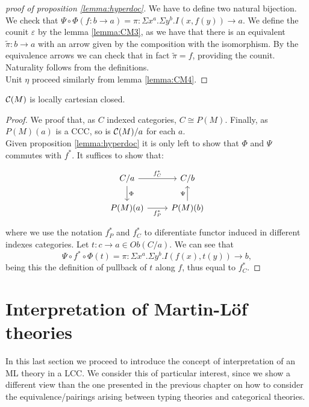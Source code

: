 \begin{proof}[proof of proposition \ref{lemma:hyperdoc}]
  We have to define two natural bijection. We check that $\Psi\circ\Phi(f:b\to a) = \pi: \Sigma x^a. \Sigma y^b.I(x,f(y)) \to a$. We define the counit $\varepsilon$ by the lemma \ref{lemma:CM3}, as we have that there is an equivalent $\tilde \pi : b \to a$ with an arrow given by the composition with the isomorphism. By the equivalence arrows we can check that in fact $\tilde \pi = f$, providing the counit. Naturality follows from the definitions.\\

  Unit $\eta$ proceed similarly from lemma \ref{lemma:CM4}.

\end{proof}
\begin{theorem}
  $\mathcal{C}(M)$ is locally cartesian closed.
\end{theorem}
\begin{proof}
  We proof that, as $C$ indexed categories, $C\cong P(M)$. Finally, as $P(M)(a)$ is a CCC, so is $\mathcal{C}(M)/a$ for each $a$.\\

  Given proposition \ref{lemma:hyperdoc} it is only left to show that $\Phi$ and $\Psi$ commutes with $f^*$. It suffices to show that:
  \[
    \begin{tikzpicture}
      \node {\begin{tikzcd}
          C/a \ar[d,"\Phi"]\ar[r,"f_C^*"] & C/b\\
          P(M)(a)\ar[r,swap,"f_P^*"] &   P(M)(b)\ar[u,"\Psi"]
        \end{tikzcd}};
    \end{tikzpicture}
  \]
  where we use the notation $f_P^*$ and $f_C^*$ to diferentiate functor induced in different indexes categories.   Let $t:c\to a \in Ob(C/a)$. We can see that
  $$\Psi\circ f^*\circ \Phi(t) = \pi: \Sigma x^a. \Sigma y^b.I(f(x),t(y)) \to b,$$
  being this the definition of pullback of $t$ along $f$, thus equal to $f_C^*$.
\end{proof}


\section{Interpretation of Martin-L\"of theories}
\label{InterpretationLCC}
In this last section we proceed to introduce the concept of interpretation of an ML theory in a LCC. We consider this of particular interest, since we show a different view than the one presented in the previous chapter on how to consider the equivalence/pairings arising between typing theories and categorical theories.\\

